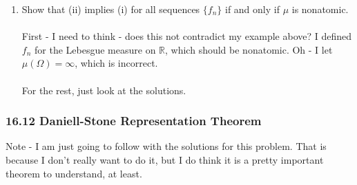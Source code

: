 \documentclass[12pt,a4paper]{article}
\newcommand{\1}[1]{\mathbbm{1}\left\{ #1 \right\}}
\newcommand{\R}{\mathbb{R}}
\begin{document}
\begin{enumerate}
	\item Show that (ii) implies (i) for all sequences $\{f_n\}$ if and only if $\mu$ is nonatomic.
	\\\\
	First - I need to think - does this not contradict my example above? I defined $f_n$ for the Lebesgue measure on $\R$, which should be nonatomic. Oh - I let $\mu(\Omega) = \infty$, which is incorrect.
	\\\\
	For the rest, just look at the solutions.
\end{enumerate}

\subsubsection{16.12 Daniell-Stone Representation Theorem} Note - I am just going to follow with the solutions for this problem. That is because I don't really want to do it, but I do think it is a pretty important theorem to understand, at least.
\end{document}
